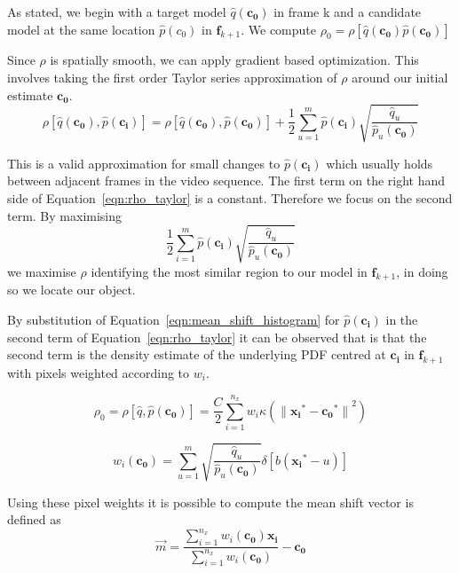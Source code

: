 As stated, we begin with a target model $\hat{q}(\mathbf{c_0})$ in frame k and a candidate
model at the same location $\hat{p}(c_0)$ in $\mathbf{f}_{k+1}$. We compute
$\rho_0=\rho[\hat{q}(\mathbf{c_0})\hat{p}(\mathbf{c_0})]$ 

Since $\rho$ is spatially smooth, we can apply gradient based optimization. This involves
taking the first order Taylor series approximation of $\rho$ around our initial
estimate $\mathbf{c_0}$. 
\begin{equation}\label{eqn:rho_taylor}
    \rho[\hat{q}(\mathbf{c_0}),\hat{p}(\mathbf{c_i})]=\rho[\hat{q}(\mathbf{c_0}),\hat{p}(\mathbf{c_0})]+\frac{1}{2}\sum_{u=1}^{m}\hat{p}(\mathbf{c_i})\sqrt{\frac{\hat{q}_u}{\hat{p}_u(\mathbf{c_0})}}
\end{equation}

This is a valid approximation for small changes to $\hat{p}(\mathbf{c_i})$
which usually holds between adjacent frames in the video sequence. 
The first term on the right hand side of Equation~\ref{eqn:rho_taylor} is a
constant. Therefore we focus on the second term.
By maximising 
\[\frac{1}{2}\sum_{i=1}^{m}\hat{p}(\mathbf{c_i})\sqrt{\frac{\hat{q}_u}{\hat{p}_u(\mathbf{c_0})}}\]
we maximise $\rho$ identifying the most similar region to our model in
$\mathbf{f}_{k+1}$, in doing so we locate our object.

By substitution of Equation~\ref{eqn:mean_shift_histogram} for $\hat{p}(\mathbf{c_i})$ in
the second term of Equation~\ref{eqn:rho_taylor} it can be observed that is that the
second term is the density estimate of the underlying PDF centred at
$\mathbf{c_i}$ in $\mathbf{f}_{k+1}$ with pixels weighted according to $w_i$.

\[\rho_0=\rho[\hat{q}, \hat{p}(\mathbf{c_0})]=\frac{C}{2}\sum_{i=1}^{n_x}w_i\kappa({\parallel{\mathbf{x_i}^*}-{\mathbf{c_0}^*}\parallel}^2)\]

\begin{equation}\label{eqn:mean_shift_weights}
    w_i(\mathbf{c_0})=\sum_{u=1}^{m}\sqrt{\frac{\hat{q}_u}{\hat{p}_u(\mathbf{c_0})}} \delta[b(\mathbf{x_i}^*-u)]
\end{equation}

Using these pixel weights it is possible to compute the mean shift vector is defined as
\begin{equation}\label{eqn:mean_shift_vector}
    \vec{m} = \frac{\sum_{i=1}^{n_x}w_i(\mathbf{c_0})\mathbf{x_i}}{\sum_{i=1}^{n_x}w_i(\mathbf{c_0})}-\mathbf{c_0}
\end{equation}

